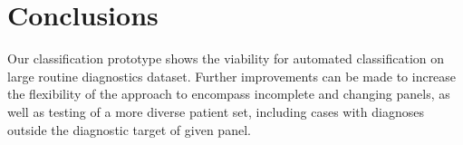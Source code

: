 \documentclass[11pt,a4paper]{article}
\begin{document}
\section{Conclusions}

Our classification prototype shows the viability for automated classification on large routine diagnostics dataset.
Further improvements can be made to increase the flexibility of the approach to encompass incomplete and changing panels, as well as testing of a more diverse patient set, including cases with diagnoses outside the diagnostic target of given panel.





\end{document}
